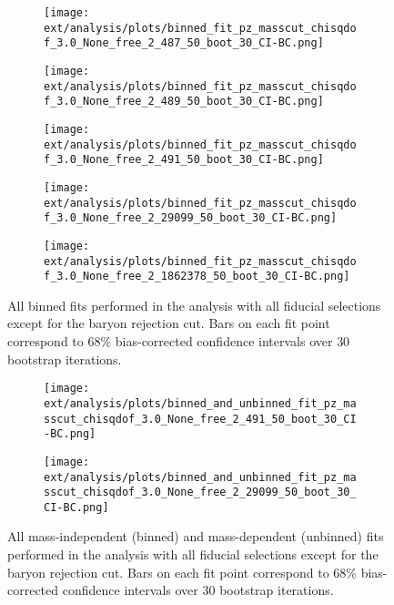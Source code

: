 \begin{figure}[htbp]
    \centering
    \begin{subfigure}{0.45\textwidth}
        \texttt{[image: ext/analysis/plots/binned\_fit\_pz\_masscut\_chisqdof\_3.0\_None\_free\_2\_487\_50\_boot\_30\_CI-BC.png]}
    \end{subfigure}
    \hfill
    \begin{subfigure}{0.45\textwidth}
        \texttt{[image: ext/analysis/plots/binned\_fit\_pz\_masscut\_chisqdof\_3.0\_None\_free\_2\_489\_50\_boot\_30\_CI-BC.png]}
    \end{subfigure}
    \vspace{1em}
    \begin{subfigure}{0.45\textwidth}
        \texttt{[image: ext/analysis/plots/binned\_fit\_pz\_masscut\_chisqdof\_3.0\_None\_free\_2\_491\_50\_boot\_30\_CI-BC.png]}
    \end{subfigure}
    \hfill
    \begin{subfigure}{0.45\textwidth}
        \texttt{[image: ext/analysis/plots/binned\_fit\_pz\_masscut\_chisqdof\_3.0\_None\_free\_2\_29099\_50\_boot\_30\_CI-BC.png]}
    \end{subfigure}
    \vspace{1em}
    \begin{subfigure}{0.45\textwidth}
        \texttt{[image: ext/analysis/plots/binned\_fit\_pz\_masscut\_chisqdof\_3.0\_None\_free\_2\_1862378\_50\_boot\_30\_CI-BC.png]}
    \end{subfigure}

    \caption{All binned fits performed in the analysis with all fiducial selections except for the baryon rejection cut. Bars on each fit point correspond to $68\%$ bias-corrected confidence intervals over $ 30 $ bootstrap iterations.}
    \label{fig:binned-fit-all-no-baryon-rejection}
\end{figure}

\begin{figure}[htbp]
    \centering
    \begin{subfigure}{0.45\textwidth}
        \texttt{[image: ext/analysis/plots/binned\_and\_unbinned\_fit\_pz\_masscut\_chisqdof\_3.0\_None\_free\_2\_491\_50\_boot\_30\_CI-BC.png]}
    \end{subfigure}
    \vspace{1em}
    \begin{subfigure}{0.45\textwidth}
        \texttt{[image: ext/analysis/plots/binned\_and\_unbinned\_fit\_pz\_masscut\_chisqdof\_3.0\_None\_free\_2\_29099\_50\_boot\_30\_CI-BC.png]}
    \end{subfigure}
    \caption{All mass-independent (binned) and mass-dependent (unbinned) fits performed in the analysis with all fiducial selections except for the baryon rejection cut. Bars on each fit point correspond to $68\%$ bias-corrected confidence intervals over $ 30 $ bootstrap iterations.}
    \label{fig:unbinned-fit-all-no-baryon-rejection}
\end{figure}

